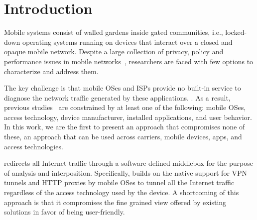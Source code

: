 \section{Introduction}
\label{sec:introduction}


Mobile systems consist of walled gardens inside gated communities, i.e., locked-down operating systems running on devices that interact over a closed and opaque mobile network. 
Despite a large collection of privacy, policy and performance issues in mobile networks~\cite{enck:taintdroid,hornyack:appfence,speedtest,ma:edoctor,pathak:eprof,bickford:mobilemalware}, researchers are faced with few options to characterize and address them.


The key challenge is that mobile OSes and ISPs provide no built-in service to diagnose the network traffic generated by these applications. 
.
As a result, previous studies~\cite{vallina-rod:ads,gerber:passivespeed,chen:wifi,enck:taintdroid,wang:middleboxes,sommers:cellwifi} are constrained by at least one of the following: mobile OSes, access technology, device manufacturer, installed applications, and user behavior.
In this work, we are the first to present an approach that compromises none of these, an approach that can be used across carriers, mobile devices, apps, and access technologies.

\meddle redirects all Internet traffic through a software-defined middlebox for the purpose of analysis and interposition.
Specifically, \meddle builds on the native support for VPN tunnels and HTTP proxies by mobile OSes to tunnel all the Internet traffic regardless of the access technology used by the device. 
A shortcoming of this approach is that it compromises the fine grained view offered by existing solutions in favor of being user-friendly.


